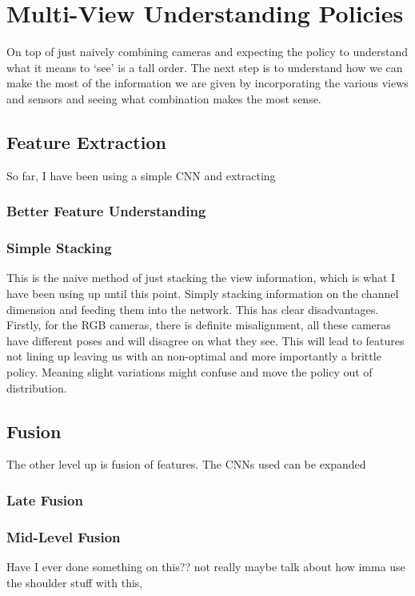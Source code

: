 \section{Multi-View Understanding Policies}
On top of just naively combining cameras and expecting the policy to understand what it means to `see' is a tall order. The next step is to understand how we can make the most of the information we are given by incorporating the various views and sensors and seeing what combination makes the most sense.

\subsection{Feature Extraction}
So far, I have been using a simple CNN and extracting 

\subsubsection{Better Feature Understanding}


\subsubsection{Simple Stacking}
This is the naive method of just stacking the view information, which is what I have been using up until this point. Simply stacking information on the channel dimension and feeding them into the network. This has clear disadvantages. Firstly, for the RGB cameras, there is definite misalignment, all these cameras have different poses and will disagree on what they see. This will lead to features not lining up leaving us with an non-optimal and more importantly a brittle policy. Meaning slight variations might confuse and move the policy out of distribution.

\subsection{Fusion}
The other level up is fusion of features. The CNNs used can be expanded 
\subsubsection{Late Fusion}

\subsubsection{Mid-Level Fusion}
Have I ever done something on this?? not really maybe talk about how imma use the shoulder stuff with this,


